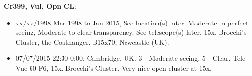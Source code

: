 {\bf Cr399, Vul, Opn CL}:
\begin{itemize}
\item xx/xx/1998 Mar 1998 to Jan 2015, See location(s) later. Moderate to perfect seeing, Moderate to clear transparency. See telescope(s) later, 15x. Brocchi's Cluster, the Coathanger. B15x70, Newcastle (UK).
\item 07/07/2015 22:30-0:00, Cambridge, UK. 3 - Moderate seeing, 5 - Clear. Tele Vue 60 F6, 15x. Brocchi's Cluster. Very nice open cluster at 15x. 
\end{itemize}
